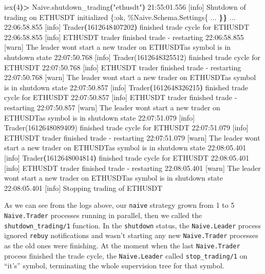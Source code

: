 \documentclass[
  oneside]{book}
\newenvironment{Shaded}{\begin{snugshade}}{\end{snugshade}}
\newcommand{\AttributeTok}[1]{\textcolor[rgb]{0.77,0.63,0.00}{#1}}
\newcommand{\ErrorTok}[1]{\textcolor[rgb]{0.64,0.00,0.00}{\textbf{#1}}}
\newcommand{\ExtensionTok}[1]{#1}
\newcommand{\KeywordTok}[1]{\textcolor[rgb]{0.13,0.29,0.53}{\textbf{#1}}}
\newcommand{\NormalTok}[1]{#1}
\newcommand{\OperatorTok}[1]{\textcolor[rgb]{0.81,0.36,0.00}{\textbf{#1}}}
\newcommand{\StringTok}[1]{\textcolor[rgb]{0.31,0.60,0.02}{#1}}
\begin{document}
\begin{Shaded}
\begin{Highlighting}[]
\ExtensionTok{iex}\ErrorTok{(}\ExtensionTok{4}\KeywordTok{)}\OperatorTok{\textgreater{}}\NormalTok{ Naive.shutdown\_trading}\KeywordTok{(}\StringTok{"ethusdt"}\KeywordTok{)}
\ExtensionTok{21:55:01.556}\NormalTok{ [info]  Shutdown of trading on ETHUSDT initialized}
\ExtensionTok{\{:ok,}
 \ExtensionTok{\%Naive.Schema.Settings\{}
     \ExtensionTok{...}
 \ErrorTok{\}\}}
\ExtensionTok{...}
\ExtensionTok{22:06:58.855}\NormalTok{ [info]  Trader}\ErrorTok{(}\ExtensionTok{1612648407202}\KeywordTok{)} \ExtensionTok{finished}\NormalTok{ trade cycle for ETHUSDT}
\ExtensionTok{22:06:58.855}\NormalTok{ [info]  ETHUSDT trader finished trade }\AttributeTok{{-}}\NormalTok{ restarting}
\ExtensionTok{22:06:58.855}\NormalTok{ [warn]  The leader won}\StringTok{\textquotesingle{}t start a new trader on ETHUSDTas symbol is in shutdown state}
\StringTok{22:07:50.768 [info]  Trader(1612648325512) finished trade cycle for ETHUSDT}
\StringTok{22:07:50.768 [info]  ETHUSDT trader finished trade {-} restarting}
\StringTok{22:07:50.768 [warn]  The leader won\textquotesingle{}}\NormalTok{t start a new trader on ETHUSDTas symbol is in shutdown state}
\ExtensionTok{22:07:50.857}\NormalTok{ [info]  Trader}\ErrorTok{(}\ExtensionTok{1612648326215}\KeywordTok{)} \ExtensionTok{finished}\NormalTok{ trade cycle for ETHUSDT}
\ExtensionTok{22:07:50.857}\NormalTok{ [info]  ETHUSDT trader finished trade }\AttributeTok{{-}}\NormalTok{ restarting}
\ExtensionTok{22:07:50.857}\NormalTok{ [warn]  The leader won}\StringTok{\textquotesingle{}t start a new trader on ETHUSDTas symbol is in shutdown state}
\StringTok{22:07:51.079 [info]  Trader(1612648089409) finished trade cycle for ETHUSDT}
\StringTok{22:07:51.079 [info]  ETHUSDT trader finished trade {-} restarting}
\StringTok{22:07:51.079 [warn]  The leader won\textquotesingle{}}\NormalTok{t start a new trader on ETHUSDTas symbol is in shutdown state}
\ExtensionTok{22:08:05.401}\NormalTok{ [info]  Trader}\ErrorTok{(}\ExtensionTok{1612648004814}\KeywordTok{)} \ExtensionTok{finished}\NormalTok{ trade cycle for ETHUSDT}
\ExtensionTok{22:08:05.401}\NormalTok{ [info]  ETHUSDT trader finished trade }\AttributeTok{{-}}\NormalTok{ restarting}
\ExtensionTok{22:08:05.401}\NormalTok{ [warn]  The leader won}\StringTok{\textquotesingle{}t start a new trader on ETHUSDTas symbol is in shutdown state}
\StringTok{22:08:05.401 [info]  Stopping trading of ETHUSDT}
\end{Highlighting}
\end{Shaded}

As we can see from the logs above, our \texttt{naive} strategy grown from 1 to 5 \texttt{Naive.Trader} processes running in parallel, then we called the \texttt{shutdown\_trading/1} function. In the \texttt{shutdown} status, the \texttt{Naive.Leader} process ignored \texttt{rebuy} notifications and wasn't starting any new \texttt{Naive.Trader} processes as the old ones were finishing. At the moment when the last \texttt{Naive.Trader} process finished the trade cycle, the \texttt{Naive.Leader} called \texttt{stop\_trading/1} on ``it's'' symbol, terminating the whole supervision tree for that symbol.
\end{document}
